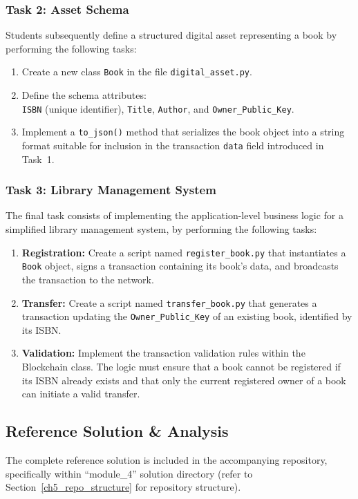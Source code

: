 \subsubsection*{Task 2: Asset Schema}
Students subsequently define a structured digital asset representing a book by performing the following tasks:

\begin{enumerate}
    \item Create a new class \texttt{Book} in the file \texttt{digital\_asset.py}.
    \item Define the schema attributes: \\ \texttt{ISBN} (unique identifier), \texttt{Title}, \texttt{Author}, and \texttt{Owner\_Public\_Key}.
    \item Implement a \texttt{to\_json()} method that serializes the book object into a string format suitable for inclusion in the transaction \texttt{data} field introduced in Task~1.
\end{enumerate}

\subsubsection*{Task 3: Library Management System}
The final task consists of implementing the application-level business logic for a simplified library management system, by performing the following tasks:

\begin{enumerate}
    \item \textbf{Registration:}  
    Create a script named \texttt{register\_book.py} that instantiates a \texttt{Book} object, signs a transaction containing its book's data, and broadcasts the transaction to the network.

    \item \textbf{Transfer:}  
    Create a script named \texttt{transfer\_book.py} that generates a transaction updating the \texttt{Owner\_Public\_Key} of an existing book, identified by its ISBN.

    \item \textbf{Validation:}  
    Implement the transaction validation rules within the Blockchain class. The logic must ensure that a book cannot be registered if its ISBN already exists and that only the current registered owner of a book can initiate a valid transfer.
\end{enumerate}


\subsection{Reference Solution \& Analysis}
The complete reference solution is included in the accompanying repository, specifically within \enquote{module\_4} solution directory (refer to Section~\ref{ch5_repo_structure} for repository structure).


